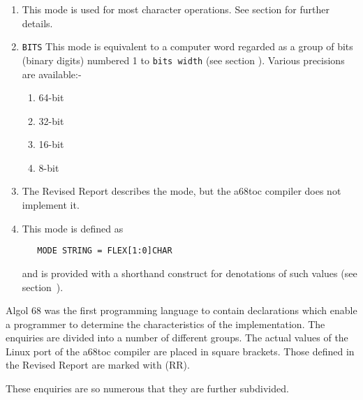\begin{enumerate}
\begin{enumerate}
\end{enumerate}
\item {} \newline
This mode is used for most character operations. See section
 for further details.
\item \verb|BITS| \newline
This mode is equivalent to a computer word regarded as a group of bits
(binary digits) numbered 1 to \verb|bits width| (see
section ). Various precisions are available:-
\begin{enumerate}
\item {} 64-bit
\item {} 32-bit
\item {} 16-bit
\item {} 8-bit
\end{enumerate}
\item {} \newline
The Revised Report describes the mode, but the a68toc compiler does not
implement it.
\item {} \newline
This mode is defined as
\begin{verbatim}
   MODE STRING = FLEX[1:0]CHAR
\end{verbatim}
\noindent
and is provided with a shorthand construct for denotations of such
values (see section~).
\end{enumerate}

Algol 68 was the first programming language to contain declarations
which enable a programmer to determine the characteristics of the
implementation. The enquiries are divided into a number of different
groups. The actual values of the Linux port of the a68toc compiler
are placed in square brackets. Those defined in the Revised Report
are marked with (RR).

These enquiries are so numerous that they are further subdivided.

